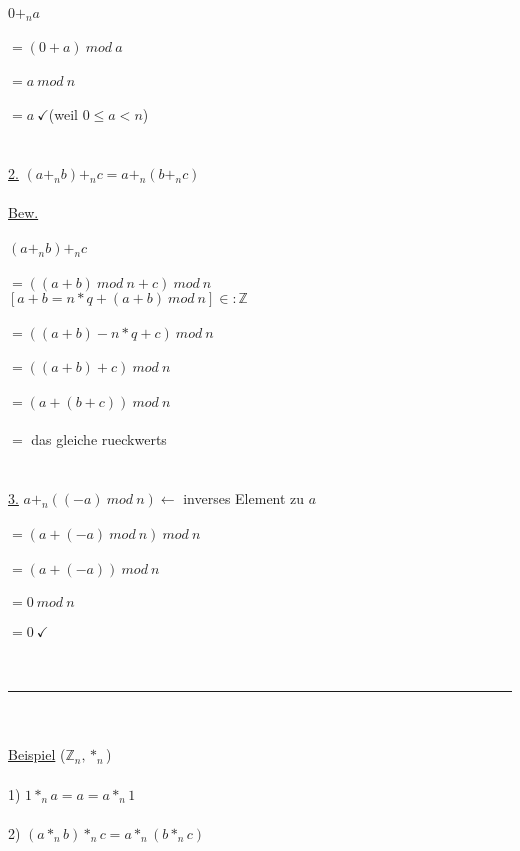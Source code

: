 \documentclass[18pt,a4paper]{article}
\newcommand{\tab}{\hspace*{2em}}
\begin{document}
\\
$0 +_n a$\\
\\
$= (0+a)\: mod\: a$\\
\\
$= a\: mod\: n$\\
\\
$= a\:\checkmark$\tab (weil $0\leqslant a<n$)\\
\\
\\
\uline{2.} $(a +_n b) +_n c = a +_n (b +_n c)$\\
\\
\uline{Bew.}\\
\\
$(a +_n b) +_n c$\\
\\
$= ((a+b)\: mod\: n + c)\: mod\: n$\\
$[a+b = n*q + (a+b) \: mod\: n] \in:\mathbb{Z}$\\
\\
$= ((a+b) - n*q +c)\: mod\: n$\\
\\
$= ((a+b)+c)\: mod\: n$\\
\\
$= (a+(b+c))\: mod\: n$\\
\\
$=$ das gleiche rueckwerts\\
\\
\\
\uline{3.} $a +_n ((-a)\: mod\: n)$\tab $\leftarrow$ inverses Element zu $a$\\
\\
$= (a+(-a) \: mod\: n)\: mod\: n$\\
\\
$=(a+ (-a))\: mod\: n$\\
\\
$= 0\: mod\: n$\\
\\
$= 0\: \checkmark$\\
\\
\\
\rule{\textwidth}{0.4mm}\\
\\
\uline{Beispiel} ($\mathbb{Z}_n, *_n$)\\
\\
1) $1 *_n a = a = a *_n 1$\\
\\
2) $(a *_n b) *_n c = a *_n (b *_n c)$\\
\end{document}
